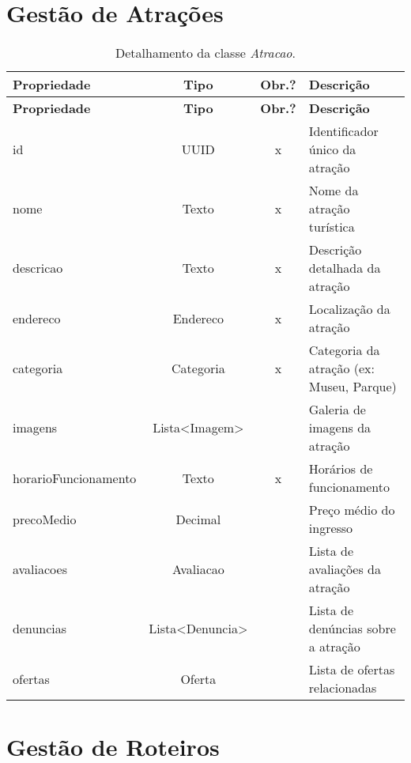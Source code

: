 \section{Gestão de Atrações}
\label{sec-dicionario-atracoes}

\begin{longtable}{|p{3.5cm}|c|c|p{8cm}|}
    \caption{Detalhamento da classe \emph{Atracao}.}
    \label{tbl-dicionario-atracao} \\\hline 
    
    \rowcolor{lightgray}
    \textbf{Propriedade} & \textbf{Tipo} & \textbf{Obr.?} & \textbf{Descrição} \\\hline
    \endfirsthead
    \hline
    \rowcolor{lightgray}
    \textbf{Propriedade} & \textbf{Tipo} & \textbf{Obr.?} & \textbf{Descrição} \\\hline
    \endhead
    
    id & UUID & x & Identificador único da atração \\\hline
    nome & Texto & x & Nome da atração turística \\\hline
    descricao & Texto & x & Descrição detalhada da atração \\\hline
    endereco & Endereco & x & Localização da atração \\\hline
    categoria & Categoria & x & Categoria da atração (ex: Museu, Parque) \\\hline
    imagens & Lista<Imagem> & & Galeria de imagens da atração \\\hline
    horarioFuncionamento & Texto & x & Horários de funcionamento \\\hline
    precoMedio & Decimal & & Preço médio do ingresso \\\hline
    avaliacoes & Avaliacao & & Lista de avaliações da atração \\\hline
	denuncias & Lista<Denuncia> & & Lista de denúncias sobre a atração \\\hline
    ofertas & Oferta & & Lista de ofertas relacionadas \\\hline
\end{longtable}

\section{Gestão de Roteiros}
\label{sec-dicionario-roteiros}

